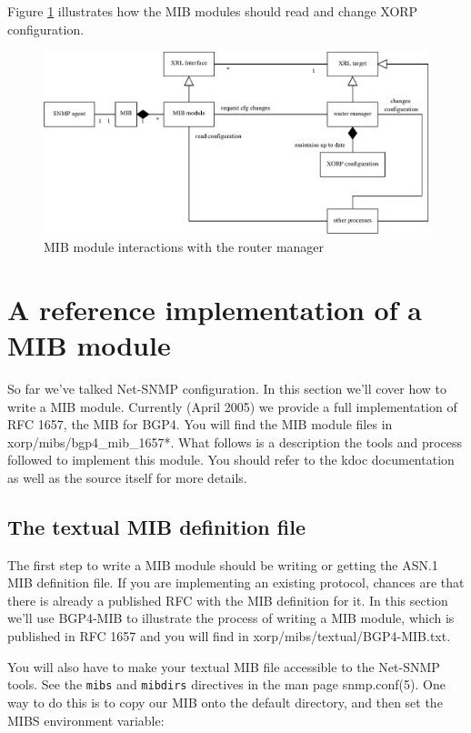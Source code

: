\documentclass[11pt]{article}
\begin{document}
Figure \ref{fig:mib-class-diag} illustrates how the MIB modules should read and
change XORP configuration.

\begin{figure}
  \begin{center}
    \includegraphics[width=1\textwidth]{figs/snmp_fig1}
  \end{center}
  \caption{MIB module interactions with the router manager}
  \label{fig:mib-class-diag}
\end{figure}


\section{A reference implementation of a MIB module}

So far we've talked Net-SNMP configuration.  In this section we'll cover
how to write a MIB module.  Currently (April 2005) we provide a full
implementation of RFC 1657, the MIB for BGP4.  You will find the MIB module
files in xorp/mibs/bgp4\_mib\_1657*.  What follows is a description the tools
and process followed to implement this module.  You should refer to the
kdoc documentation as well as the source itself for more details.   

\subsection{The textual MIB definition file}
The first step to write a MIB module should be writing or getting the ASN.1 MIB
definition file.  If you are implementing an existing protocol, chances are
that there is already a published RFC with the MIB definition for it.  In this
section we'll use BGP4-MIB to illustrate the process of writing a MIB module,
which is published in RFC 1657 and you will find in
xorp/mibs/textual/BGP4-MIB.txt.

You will also have to  make your textual MIB file accessible to the Net-SNMP
tools.  See the \texttt{mibs} and \texttt{mibdirs} directives in the man page
snmp.conf(5).  One way to do this is to copy our MIB onto the default directory,
and then set the MIBS environment variable:
\end{document}

